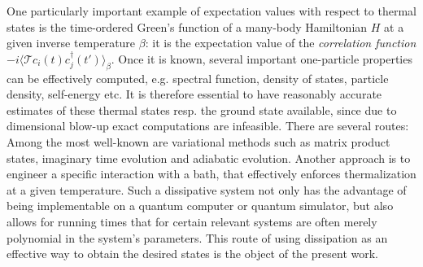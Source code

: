 \documentclass[12pt,a4paper]{article}
\begin{document}
One particularly important example of expectation values with respect to thermal states is the time-ordered  Green's function of a many-body Hamiltonian $H$ at a given inverse temperature $\beta$: it is the expectation value of the \emph{correlation function} $ - i\langle \mathcal{T} c_i(t) c_j^{\dagger}(t')\rangle_{\beta}$. Once it is known, several important one-particle properties can be effectively computed, e.g. spectral function, density of states, particle density, self-energy etc.
It is therefore essential to have reasonably accurate estimates of these thermal states resp. the ground state available, since due to dimensional blow-up exact computations are infeasible. There are several routes: %
Among the most well-known are variational methods such as matrix product states, imaginary time evolution and adiabatic evolution. Another approach is
to engineer a specific interaction with a bath, that effectively enforces thermalization at a given temperature. Such a dissipative system not only has the advantage of being implementable on a quantum computer or quantum simulator, but also allows for running times that for certain relevant systems are often merely polynomial in the system's parameters.  This route of using dissipation as an effective way to obtain the desired states is the object %
of the present work. 
\end{document}
